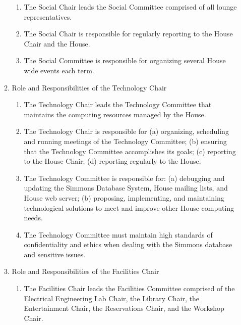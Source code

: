 \documentclass[letterpaper]{article}
\begin{document}
\begin{enumerate}
\begin{enumerate}
\begin{enumerate}

\item The Social Chair leads the Social Committee comprised of all lounge representatives.
 
\item The Social Chair is responsible for regularly reporting to the House Chair and the House.

\item The Social Committee is responsible for organizing several House wide events each term.

\end{enumerate}

\item Role and Responsibilities of the Technology Chair 

\begin{enumerate}

\item The Technology Chair leads the Technology Committee that maintains the computing resources managed by the House. 

\item The Technology Chair is responsible for (a) organizing, scheduling and running meetings of the Technology Committee; (b) ensuring that the Technology Committee accomplishes its goals; (c) reporting to the House Chair; (d) reporting regularly to the House.

\item The Technology Committee is responsible for: (a) debugging and updating the Simmons Database System, House mailing lists, and House web server; (b) proposing, implementing, and maintaining technological solutions to meet and improve other House computing needs.

\item The Technology Committee must maintain high standards of confidentiality and ethics when dealing with the Simmons database and sensitive issues.

\end{enumerate}

\item Role and Responsibilities of the Facilities Chair 

\begin{enumerate}

\item The Facilities Chair leads the Facilities Committee comprised of the Electrical Engineering Lab Chair, the Library Chair, the Entertainment Chair, the Reservations Chair, and the Workshop Chair. 


\end{enumerate}
\end{enumerate}
\end{enumerate}
\end{document}
